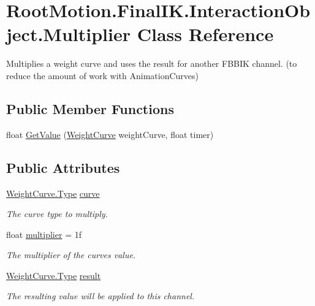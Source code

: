 \hypertarget{class_root_motion_1_1_final_i_k_1_1_interaction_object_1_1_multiplier}{}\section{Root\+Motion.\+Final\+I\+K.\+Interaction\+Object.\+Multiplier Class Reference}
\label{class_root_motion_1_1_final_i_k_1_1_interaction_object_1_1_multiplier}


Multiplies a weight curve and uses the result for another F\+B\+B\+IK channel. (to reduce the amount of work with Animation\+Curves)  


\subsection*{Public Member Functions}
\begin{DoxyCompactItemize}
\item 
float \mbox{\hyperlink{class_root_motion_1_1_final_i_k_1_1_interaction_object_1_1_multiplier_af21874dddab32400b196edf76968241c}{Get\+Value}} (\mbox{\hyperlink{class_root_motion_1_1_final_i_k_1_1_interaction_object_1_1_weight_curve}{Weight\+Curve}} weight\+Curve, float timer)
\end{DoxyCompactItemize}
\subsection*{Public Attributes}
\begin{DoxyCompactItemize}
\item 
\mbox{\hyperlink{class_root_motion_1_1_final_i_k_1_1_interaction_object_1_1_weight_curve_a74c8be2e80ace86b130c88e275300b27}{Weight\+Curve.\+Type}} \mbox{\hyperlink{class_root_motion_1_1_final_i_k_1_1_interaction_object_1_1_multiplier_a0087e8ef30ca643a39ed3ce1e97ce06e}{curve}}
\begin{DoxyCompactList}\small\item\em The curve type to multiply. \end{DoxyCompactList}\item 
float \mbox{\hyperlink{class_root_motion_1_1_final_i_k_1_1_interaction_object_1_1_multiplier_a877404b8510c6d2ba7e998c931620747}{multiplier}} = 1f
\begin{DoxyCompactList}\small\item\em The multiplier of the curve\textquotesingle{}s value. \end{DoxyCompactList}\item 
\mbox{\hyperlink{class_root_motion_1_1_final_i_k_1_1_interaction_object_1_1_weight_curve_a74c8be2e80ace86b130c88e275300b27}{Weight\+Curve.\+Type}} \mbox{\hyperlink{class_root_motion_1_1_final_i_k_1_1_interaction_object_1_1_multiplier_acd66cad76ca6528529f795b8c90849f4}{result}}
\begin{DoxyCompactList}\small\item\em The resulting value will be applied to this channel. \end{DoxyCompactList}\end{DoxyCompactItemize}


